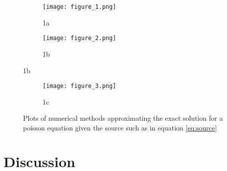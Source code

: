 \documentclass[12pt]{article}
\begin{document}
\begin{figure}
\begin{subfigure}{\linewidth}
  \centering
  \texttt{[image: figure\_1.png]}
  \caption*{1a}
  \label{fig:sfig11}
\end{subfigure}%

\begin{subfigure}{\linewidth}
  \centering
  \texttt{[image: figure\_2.png]}
  \caption*{1b}
  \label{fig:sfig12}
\end{subfigure}
\label{fig:fig1}
\end{figure}

\begin{figure}
\begin{subfigure}{\linewidth}
  \centering
  \texttt{[image: figure\_3.png]}
  \caption*{1c}
  \label{fig:sfig21}
\end{subfigure}%

\caption{Plots of numerical methods approximating the exact solution for a poisson equation given the source such as in equation \ref{eq:source}}
\label{fig:fig2}

\end{figure}

 

\section{Discussion}
\end{document}
